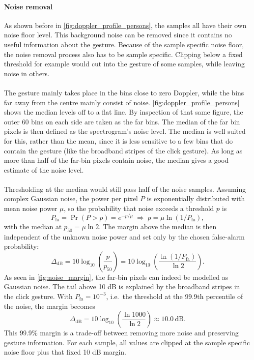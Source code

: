 \documentclass[10pt,a4paper,titlepage]{article}
\begin{document}
\paragraph{Noise removal}
As shown before in \autoref{fig:doppler_profile_persons}, the samples all have their own noise floor level. This background noise can be removed since it contains no useful information about the gesture. Because of the sample specific noise floor, the noise removal process also has to be sample specific. Clipping below a fixed threshold for example would cut into the gesture of some samples, while leaving noise in others. 
\\\\
The gesture mainly takes place in the bins close to zero Doppler, while the bins far away from the centre mainly consist of noise. \autoref{fig:doppler_profile_persons} shows the median levels off to a flat line. By inspection of that same figure, the outer 60 bins on each side are taken as the far bins. The median of the far bin pixels is then defined as the spectrogram's noise level. The median is well suited for this, rather than the mean, since it is less sensitive to a few bins that do contain the gesture (like the broadband stripes of the click gesture). As long as more than half of the far-bin pixels contain noise, the median gives a good estimate of the noise level.
\\\\
Thresholding at the median would still pass half of the noise samples. Assuming complex Gaussian noise, the power per pixel $P$ is exponentially distributed with mean noise power $\mu$, so the probability that noise exceeds a threshold $p$ is 
\begin{equation}
  P_{\mathrm{fa}} = \Pr(P > p) = e^{-p/\mu}
  \;\Rightarrow\; p = \mu \ln(1/P_{\mathrm{fa}}),
\end{equation}
with the median at $p_{50} = \mu \ln 2$. The margin above the median is then independent of the unknown noise power and set only by the chosen false-alarm probability:
\begin{equation}
  \Delta_{\mathrm{dB}}
  = 10 \log_{10}\!\left(\frac{p}{p_{50}}\right)
  = 10 \log_{10}\!\left(\frac{\ln(1/P_{\mathrm{fa}})}{\ln 2}\right).
\end{equation}
As seen in \autoref{fig:noise_margin}, the far-bin pixels can indeed be modelled as Gaussian noise. The tail above 10 dB is explained by the broadband stripes in the click gesture. With $P_{\mathrm{fa}} = 10^{-3}$, i.e.\ the threshold at the 99.9th percentile of the noise, the margin becomes
\begin{equation}
  \Delta_{\mathrm{dB}}
  = 10 \log_{10}\!\left(\frac{\ln 1000}{\ln 2}\right)
  \approx 10.0~\text{dB}.
\end{equation}
This 99.9\% margin is a trade-off between removing more noise and preserving gesture information. For each sample, all values are clipped at the sample specific noise floor plus that fixed 10 dB margin.
\end{document}
